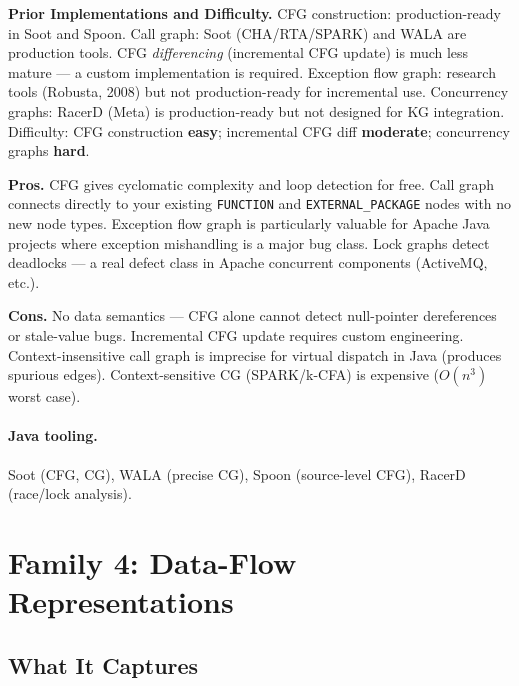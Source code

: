 \documentclass[12pt,a4paper]{article}
\begin{document}
\begin{implbox}
\textbf{Prior Implementations and Difficulty.}
CFG construction: production-ready in Soot and Spoon. Call graph: Soot
(CHA/RTA/SPARK) and WALA are production tools. CFG \emph{differencing}
(incremental CFG update) is much less mature --- a custom implementation is
required. Exception flow graph: research tools (Robusta, 2008) but not
production-ready for incremental use. Concurrency graphs: RacerD (Meta) is
production-ready but not designed for KG integration. Difficulty: CFG
construction \textbf{easy}; incremental CFG diff \textbf{moderate};
concurrency graphs \textbf{hard}.
\end{implbox}

\begin{prosbox}
\textbf{Pros.}
CFG gives cyclomatic complexity and loop detection for free. Call graph
connects directly to your existing \texttt{FUNCTION} and
\texttt{EXTERNAL\_PACKAGE} nodes with no new node types. Exception flow
graph is particularly valuable for Apache Java projects where exception
mishandling is a major bug class. Lock graphs detect deadlocks --- a real
defect class in Apache concurrent components (ActiveMQ, etc.).
\end{prosbox}

\begin{consbox}
\textbf{Cons.}
No data semantics --- CFG alone cannot detect null-pointer dereferences or
stale-value bugs. Incremental CFG update requires custom engineering.
Context-insensitive call graph is imprecise for virtual dispatch in Java
(produces spurious edges). Context-sensitive CG (SPARK/k-CFA) is expensive
($O(n^3)$ worst case).
\end{consbox}

\paragraph{Java tooling.} Soot (CFG, CG), WALA (precise CG), Spoon
(source-level CFG), RacerD (race/lock analysis).

\section{Family 4: Data-Flow Representations}

\subsection{What It Captures}
\end{document}
